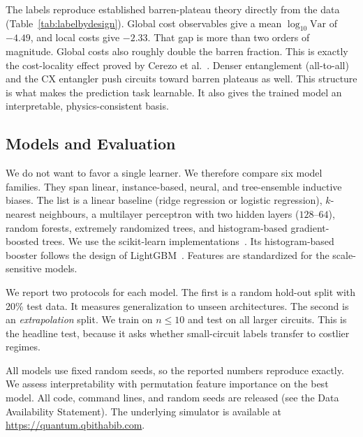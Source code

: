 \documentclass[quantumrep,article,submit,pdftex,oneauthor]{Definitions/mdpi}
\newcommand{\ExtrapCut}{10}
\begin{document}
The labels reproduce established barren-plateau theory directly from the data
(Table~\ref{tab:labelbydesign}). Global cost observables give a mean
$\log_{10}\mathrm{Var}$ of $-4.49$, and local costs give $-2.33$. That gap is
more than two orders of magnitude. Global costs also roughly double the barren
fraction. This is exactly the cost-locality effect proved by Cerezo et
al.~\cite{cerezo2021cost}. Denser entanglement (all-to-all) and the CX entangler
push circuits toward barren plateaus as well. This structure is what makes the
prediction task learnable. It also gives the trained model an interpretable,
physics-consistent basis.

\begin{table}[H]
\caption{Trainability broken down by design choice. Lower mean
$\log_{10}\mathrm{Var}$ and higher barren \% indicate less trainable families. The
data recovers known barren-plateau drivers.\label{tab:labelbydesign}}
\centering

\end{table}

\subsection{Models and Evaluation}
We do not want to favor a single learner. We therefore compare six model
families. They span linear, instance-based, neural, and tree-ensemble inductive
biases. The list is a linear baseline (ridge regression or logistic regression),
$k$-nearest neighbours, a multilayer perceptron with two hidden layers
($128$--$64$), random forests, extremely randomized trees, and histogram-based
gradient-boosted trees. We use the scikit-learn
implementations~\cite{pedregosa2011scikit}. Its histogram-based booster follows
the design of LightGBM~\cite{ke2017lightgbm}. Features are standardized for the
scale-sensitive models.

We report two protocols for each model. The first is a random hold-out split with
20\% test data. It measures generalization to unseen architectures. The second is
an \emph{extrapolation} split. We train on $n\le\ExtrapCut{}$ and test on all
larger circuits. This is the headline test, because it asks whether
small-circuit labels transfer to costlier regimes.

All models use fixed random seeds, so the reported numbers reproduce exactly. We
assess interpretability with permutation feature importance on the best model.
All code, command lines, and random seeds are released (see the Data Availability
Statement). The underlying simulator is available at
\url{https://quantum.qbithabib.com}.
\end{document}
